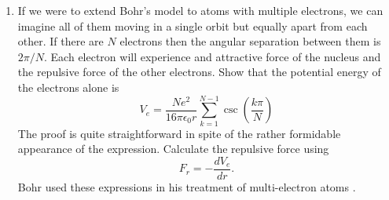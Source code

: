 \begin{enumerate}
\item If we were to extend Bohr's model to atoms with multiple electrons, we
can imagine all of them moving in a single orbit but equally apart from each
other. If there are $N$ electrons then the angular separation between them is
$2\pi/N$. Each electron will experience and attractive force of the nucleus and
the repulsive force of the other electrons. Show that the potential energy of 
the electrons alone is
\begin{equation}\label{c3s3e20}
V_e = \frac{Ne^2}{16\pi\epsilon_0 r}
      \sum_{k=1}^{N-1}\csc\left(\frac{k\pi}{N}\right)
\end{equation}
The proof is quite straightforward in spite of the rather formidable appearance
of the expression. Calculate the repulsive force using
\begin{equation}\label{c3s3e21}
F_r = -\frac{dV_e}{dr}.
\end{equation}
Bohr used these expressions in his treatment of multi-electron atoms 
\cite{bohr1913constitution}.
\end{enumerate}